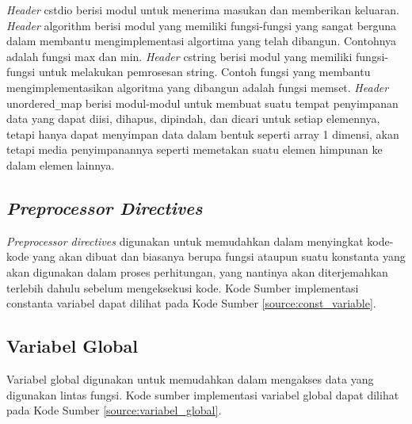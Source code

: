 

\textit{Header} {\selectfont cstdio} berisi modul untuk menerima masukan dan memberikan keluaran. \textit{Header} {\selectfont algorithm} berisi modul yang memiliki fungsi-fungsi yang sangat berguna dalam membantu mengimplementasi algortima yang telah dibangun. Contohnya adalah fungsi {\selectfont max} dan {\selectfont min}. \textit{Header} {\selectfont cstring }berisi modul yang memiliki fungsi-fungsi untuk melakukan pemrosesan {\selectfont string}. Contoh fungsi yang membantu mengimplementasikan algoritma yang dibangun adalah fungsi {\selectfont memset}. \textit{Header} {\selectfont unordered\verb|_|map} berisi modul-modul untuk membuat suatu tempat penyimpanan data yang dapat diisi, dihapus, dipindah, dan dicari untuk setiap elemennya, tetapi hanya dapat menyimpan data dalam bentuk seperti array 1 dimensi, akan tetapi media penyimpanannya seperti memetakan suatu elemen himpunan ke dalam elemen lainnya. 

\subsection{\textit{Preprocessor Directives}}
\textit{Preprocessor directives} digunakan untuk memudahkan dalam menyingkat kode-kode yang akan dibuat dan biasanya berupa fungsi ataupun suatu konstanta yang akan digunakan dalam proses perhitungan, yang nantinya akan diterjemahkan terlebih dahulu sebelum mengeksekusi kode. Kode Sumber implementasi constanta variabel dapat dilihat pada Kode Sumber \ref{source:const_variable}.

\begin{minipage}{\linewidth}

\end{minipage}

\subsection{Variabel Global}
Variabel global digunakan untuk memudahkan dalam mengakses data yang digunakan lintas fungsi. Kode sumber implementasi variabel global dapat dilihat pada Kode Sumber \ref{source:variabel_global}.


